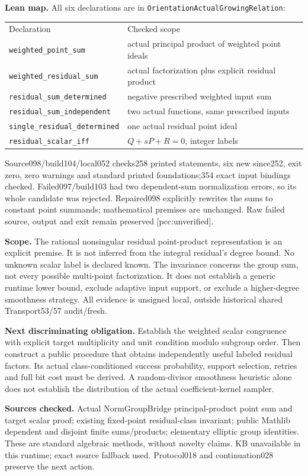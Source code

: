 \documentclass[11pt]{article}
\begin{document}
\textbf{Lean map.}
All six declarations are in \texttt{OrientationActualGrowingRelation}:
\begin{center}\begin{tabular}{ll}
Declaration&Checked scope\\
\texttt{weighted\_point\_sum}&actual principal product of weighted point ideals\\
\texttt{weighted\_residual\_sum}&actual factorization plus explicit residual product\\
\texttt{residual\_sum\_determined}&negative prescribed weighted input sum\\
\texttt{residual\_sum\_independent}&two actual functions, same prescribed inputs\\
\texttt{single\_residual\_determined}&one actual residual point ideal\\
\texttt{residual\_scalar\_iff}&\(Q+sP+R=0\), integer labels
\end{tabular}\end{center}
Source098/build104/local052 checks258 printed statements, six new since252,
exit zero, zero warnings and standard printed foundations;354 exact input
bindings checked. Failed097/build103 had two dependent-sum normalization
errors, so its whole candidate was rejected. Repaired098 explicitly rewrites
the sums to constant point summands; mathematical premises are unchanged.
Raw failed source, output and exit remain preserved [pcc:unverified].

\textbf{Scope.}
The rational nonsingular residual point-product representation is an explicit
premise. It is not inferred from the integral residual's degree bound.
No unknown scalar label is declared known. The invariance concerns the group
sum, not every possible multi-point factorization. It does not establish a
generic runtime lower bound, exclude adaptive input support, or exclude a
higher-degree smoothness strategy. All evidence is unsigned local, outside
historical shared Transport53/57 audit/fresh.

\textbf{Next discriminating obligation.}
Establish the weighted scalar congruence with explicit target multiplicity
and unit condition modulo subgroup order. Then construct a public procedure
that obtains independently useful labeled residual factors. Its actual
class-conditioned success probability, support selection, retries and full
bit cost must be derived. A random-divisor smoothness heuristic alone does
not establish the distribution of the actual coefficient-kernel sampler.

\textbf{Sources checked.}
Actual NormGroupBridge principal-product point sum and target scalar proof;
existing fixed-point residual-class invariant; public Mathlib dependent and
disjoint finite sums/products; elementary elliptic group identities. These
are standard algebraic methods, without novelty claims. KB unavailable in
this runtime; exact source fallback used. Protocol018 and continuation028
preserve the next action.
\end{document}
